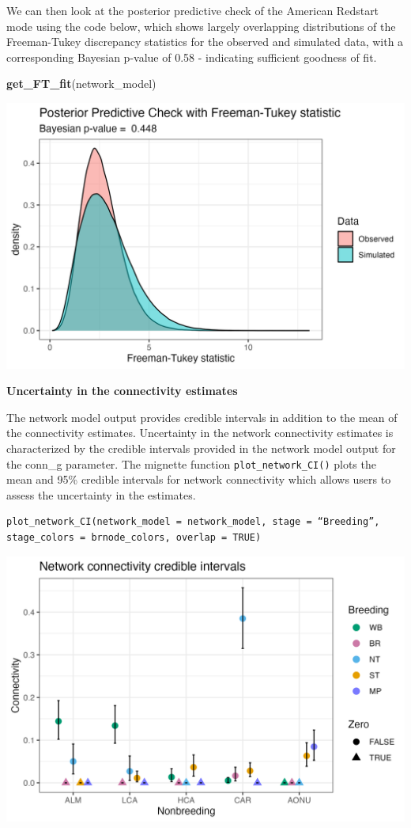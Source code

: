 \documentclass[
]{book}
\newenvironment{Shaded}{\begin{snugshade}}{\end{snugshade}}
\newcommand{\FunctionTok}[1]{\textcolor[rgb]{0.13,0.29,0.53}{\textbf{#1}}}
\newcommand{\NormalTok}[1]{#1}
\begin{document}
We can then look at the posterior predictive check of the American Redstart mode using the code below, which shows largely overlapping distributions of the Freeman-Tukey discrepancy statistics for the observed and simulated data, with a corresponding Bayesian p-value of 0.58 - indicating sufficient goodness of fit.

\begin{Shaded}
\begin{Highlighting}[]
\FunctionTok{get\_FT\_fit}\NormalTok{(network\_model)}
\end{Highlighting}
\end{Shaded}

\includegraphics[width=25in]{./images/p.fit}

\textbf{Uncertainty in the connectivity estimates}

The network model output provides credible intervals in addition to the mean of the connectivity estimates. Uncertainty in the network connectivity estimates is characterized by the credible intervals provided in the network model output for the conn\_g parameter. The mignette function \texttt{plot\_network\_CI()} plots the mean and 95\% credible intervals for network connectivity which allows users to assess the uncertainty in the estimates.

\begin{verbatim}
plot_network_CI(network_model = network_model, stage = “Breeding”, 
stage_colors = brnode_colors, overlap = TRUE)
\end{verbatim}

\includegraphics[width=25in]{./images/p.ci}
\end{document}
